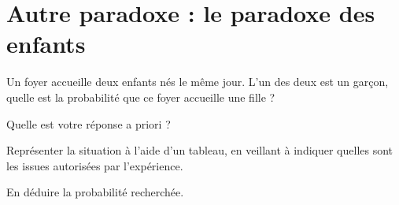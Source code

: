 \documentclass{article}
\begin{document}
\emptybox{6cm}

\section{Autre paradoxe : le paradoxe des enfants}

\begin{tcolorbox}
Un foyer accueille deux enfants nés le même jour. L'un des deux est un garçon, quelle est la probabilité que ce foyer accueille une fille ?
\end{tcolorbox}

\begin{enumquestions}
\item Quelle est votre réponse a priori ?
\item Représenter la situation à l'aide d'un tableau, en veillant à indiquer quelles sont les issues autorisées par l'expérience.
\item En déduire la probabilité recherchée. 
\end{enumquestions}
\vspace*{0.5cm}

\emptybox{6cm}
\end{document}
